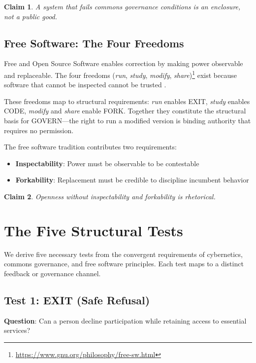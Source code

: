 \documentclass[11pt,a4paper]{article}
\newtheorem{claim}{Claim}
\begin{document}
\begin{claim}
A system that fails commons governance conditions is an enclosure, not a public good.
\end{claim}

\subsection{Free Software: The Four Freedoms}

Free and Open Source Software enables correction by making power observable and replaceable. The four freedoms (\textit{run}, \textit{study}, \textit{modify}, \textit{share})\footnote{\url{https://www.gnu.org/philosophy/free-sw.html}} exist because software that cannot be inspected cannot be trusted \citep{stallman2002}.

These freedoms map to structural requirements: \textit{run} enables EXIT, \textit{study} enables CODE, \textit{modify} and \textit{share} enable FORK. Together they constitute the structural basis for GOVERN---the right to run a modified version is binding authority that requires no permission.

The free software tradition contributes two requirements:
\begin{itemize}
    \item \textbf{Inspectability}: Power must be observable to be contestable
    \item \textbf{Forkability}: Replacement must be credible to discipline incumbent behavior
\end{itemize}

\begin{claim}
Openness without inspectability and forkability is rhetorical.
\end{claim}

\section{The Five Structural Tests}

We derive five necessary tests from the convergent requirements of cybernetics, commons governance, and free software principles. Each test maps to a distinct feedback or governance channel.

\subsection{Test 1: EXIT (Safe Refusal)}

\textbf{Question}: Can a person decline participation while retaining access to essential services?
\end{document}
